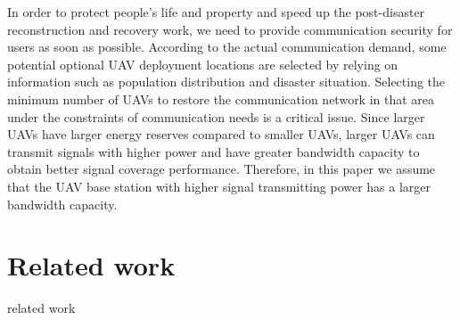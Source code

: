 \documentclass[11pt,a4paper]{article}
\begin{document}
In order to protect people's life and property and speed up the post-disaster reconstruction and recovery work, we need to provide communication security for users as soon as possible. According to the actual communication demand, some potential optional UAV deployment locations are selected by relying on information such as population distribution and disaster situation. Selecting the minimum number of UAVs to restore the communication network in that area under the constraints of communication needs is a critical issue. Since larger UAVs have larger energy reserves compared to smaller UAVs, larger UAVs can transmit signals with higher power and have greater bandwidth capacity to obtain better signal coverage performance. Therefore, in this paper we assume that the UAV base station with higher signal transmitting power has a larger bandwidth capacity.
\section{Related work}
 related work
\end{document}
